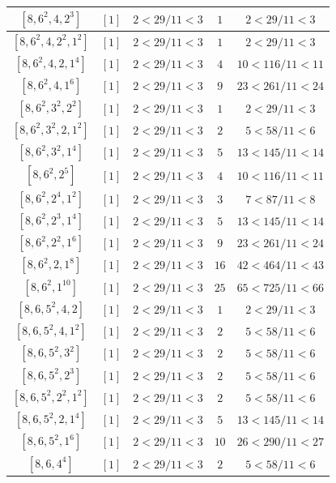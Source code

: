\documentclass{article}%
\begin{document}
\begin{center}
\begin{longtable}{||c|c|c|c|c||}
$[8, 6^{2}, 4, 2^{3}]$ & $[1]$ & $2 < 29/11 < 3$ & $1$ & $2 < 29/11 < 3$ \\ \hline 
$[8, 6^{2}, 4, 2^{2}, 1^{2}]$ & $[1]$ & $2 < 29/11 < 3$ & $1$ & $2 < 29/11 < 3$ \\ \hline 
$[8, 6^{2}, 4, 2, 1^{4}]$ & $[1]$ & $2 < 29/11 < 3$ & $4$ & $10 < 116/11 < 11$ \\ \hline 
$[8, 6^{2}, 4, 1^{6}]$ & $[1]$ & $2 < 29/11 < 3$ & $9$ & $23 < 261/11 < 24$ \\ \hline 
$[8, 6^{2}, 3^{2}, 2^{2}]$ & $[1]$ & $2 < 29/11 < 3$ & $1$ & $2 < 29/11 < 3$ \\ \hline 
$[8, 6^{2}, 3^{2}, 2, 1^{2}]$ & $[1]$ & $2 < 29/11 < 3$ & $2$ & $5 < 58/11 < 6$ \\ \hline 
$[8, 6^{2}, 3^{2}, 1^{4}]$ & $[1]$ & $2 < 29/11 < 3$ & $5$ & $13 < 145/11 < 14$ \\ \hline 
$[8, 6^{2}, 2^{5}]$ & $[1]$ & $2 < 29/11 < 3$ & $4$ & $10 < 116/11 < 11$ \\ \hline 
$[8, 6^{2}, 2^{4}, 1^{2}]$ & $[1]$ & $2 < 29/11 < 3$ & $3$ & $7 < 87/11 < 8$ \\ \hline 
$[8, 6^{2}, 2^{3}, 1^{4}]$ & $[1]$ & $2 < 29/11 < 3$ & $5$ & $13 < 145/11 < 14$ \\ \hline 
$[8, 6^{2}, 2^{2}, 1^{6}]$ & $[1]$ & $2 < 29/11 < 3$ & $9$ & $23 < 261/11 < 24$ \\ \hline 
$[8, 6^{2}, 2, 1^{8}]$ & $[1]$ & $2 < 29/11 < 3$ & $16$ & $42 < 464/11 < 43$ \\ \hline 
$[8, 6^{2}, 1^{10}]$ & $[1]$ & $2 < 29/11 < 3$ & $25$ & $65 < 725/11 < 66$ \\ \hline 
$[8, 6, 5^{2}, 4, 2]$ & $[1]$ & $2 < 29/11 < 3$ & $1$ & $2 < 29/11 < 3$ \\ \hline 
$[8, 6, 5^{2}, 4, 1^{2}]$ & $[1]$ & $2 < 29/11 < 3$ & $2$ & $5 < 58/11 < 6$ \\ \hline 
$[8, 6, 5^{2}, 3^{2}]$ & $[1]$ & $2 < 29/11 < 3$ & $2$ & $5 < 58/11 < 6$ \\ \hline 
$[8, 6, 5^{2}, 2^{3}]$ & $[1]$ & $2 < 29/11 < 3$ & $2$ & $5 < 58/11 < 6$ \\ \hline 
$[8, 6, 5^{2}, 2^{2}, 1^{2}]$ & $[1]$ & $2 < 29/11 < 3$ & $2$ & $5 < 58/11 < 6$ \\ \hline 
$[8, 6, 5^{2}, 2, 1^{4}]$ & $[1]$ & $2 < 29/11 < 3$ & $5$ & $13 < 145/11 < 14$ \\ \hline 
$[8, 6, 5^{2}, 1^{6}]$ & $[1]$ & $2 < 29/11 < 3$ & $10$ & $26 < 290/11 < 27$ \\ \hline 
$[8, 6, 4^{4}]$ & $[1]$ & $2 < 29/11 < 3$ & $2$ & $5 < 58/11 < 6$ \\ \hline 

\end{longtable}
\end{center}
\end{document}
